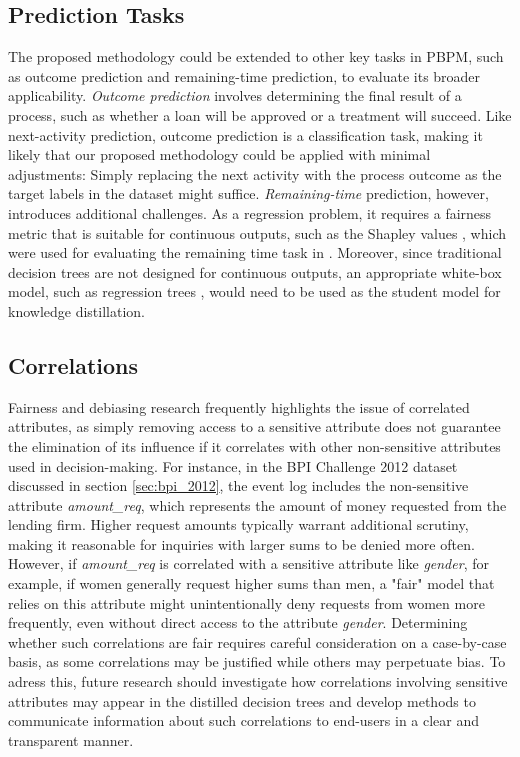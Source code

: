 \subsection*{Prediction Tasks}
The proposed methodology could be extended to other key tasks in PBPM,
such as outcome prediction and remaining-time prediction, to evaluate its broader applicability.
\textit{Outcome prediction} involves determining the final result of a process,
such as whether a loan will be approved or a treatment will succeed.
Like next-activity prediction, outcome prediction is a classification task,
making it likely that our proposed methodology could be applied with minimal adjustments:
Simply replacing the next activity with the process outcome as the target labels in the dataset might suffice.
\textit{Remaining-time} prediction, however, introduces additional challenges.
As a regression problem, it requires a fairness metric that is suitable for continuous outputs,
such as the Shapley values \cite{shapley}, which were used for evaluating the remaining time task in \cite{fairness_adversarial}. 
Moreover, since traditional decision trees are not designed for continuous outputs,
an appropriate white-box model, such as regression trees \cite{trees},
would need to be used as the student model for knowledge distillation.

\subsection*{Correlations}
Fairness and debiasing research frequently highlights the issue of correlated attributes,
as simply removing access to a sensitive attribute does not guarantee the elimination of its influence
if it correlates with other non-sensitive attributes used in decision-making.
For instance, in the BPI Challenge 2012 dataset discussed in section \ref{sec:bpi_2012},
the event log includes the non-sensitive attribute \textit{amount\_req},
which represents the amount of money requested from the lending firm.
Higher request amounts typically warrant additional scrutiny,
making it reasonable for inquiries with larger sums to be denied more often. 
However, if \textit{amount\_req} is correlated with a sensitive attribute like \textit{gender},
for example, if women generally request higher sums than men,
a "fair" model that relies on this attribute might unintentionally deny requests from women more frequently,
even without direct access to the attribute \textit{gender}.
Determining whether such correlations are fair requires careful consideration on a case-by-case basis,
as some correlations may be justified while others may perpetuate bias.
To adress this, future research should investigate how correlations involving sensitive attributes may
appear in the distilled decision trees and develop methods to communicate information about such correlations
to end-users in a clear and transparent manner.


